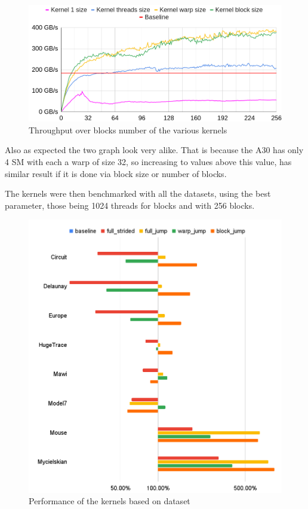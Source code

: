 \documentclass[conference]{IEEEtran}
\begin{document}
\begin{figure}[h!]
	\centering
	\includegraphics[width=1\linewidth]{data_images/Gb_for_size_grid_2}
	\caption{Throughput over blocks number of the various kernels}
	\label{fig:gbforsizegrid2}
\end{figure}

\FloatBarrier
Also as expected the two graph look very alike. That is because the A30 has only 4 SM with each a warp of size 32, so increasing to values above this value, has similar result if it is done via block size or number of blocks.

The kernels were then benchmarked with all the datasets, using the best parameter, those being 1024 threads for blocks and with 256 blocks.

\begin{figure}[h!]
	\centering
	\includegraphics[width=0.9\linewidth]{data_images/perf_gpu}
	\caption{Performance of the kernels based on dataset}
	\label{fig:perf-gpu}
\end{figure}
\FloatBarrier
\end{document}
